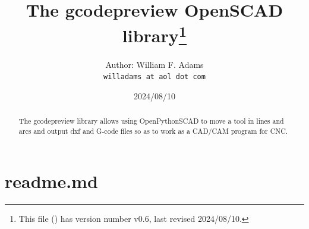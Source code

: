 \documentclass{ltxdoc}
\begin{document}

\def\fileversion{v0.6} \def\filedate{2024/08/10}





\title{The gcodepreview OpenSCAD library\thanks{This
        file (\texttt{\jobname}) has version number \fileversion, last revised
        \filedate.}}

\author{%
Author: William F. Adams\\
\texttt{willadams at aol dot com}
}
\date{\filedate}
\maketitle
\begin{abstract}
\noindent The gcodepreview library allows using OpenPythonSCAD to move a tool in lines 
and arcs and output dxf and G-code files so as to work as a CAD/\allowbreak CAM program 
for CNC.
\end{abstract}
\tableofcontents

\clearpage
\section{readme.md}
\end{document}
